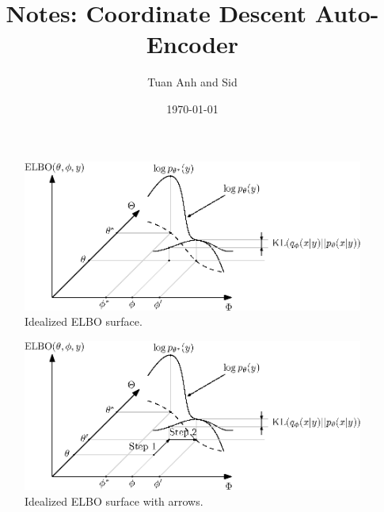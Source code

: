 \documentclass[a4paper]{article}
\title{Notes: Coordinate Descent Auto-Encoder}
\author{Tuan Anh and Sid}
\date{\today}
\begin{document}
\maketitle

\listoftodos





\begin{figure}
    \centering
    \includegraphics{figures/elbo}
    \caption{Idealized \gls{ELBO} surface.}
\end{figure}

\begin{figure}
    \centering
    \includegraphics{figures/elbo2}
    \caption{Idealized \gls{ELBO} surface with arrows.}
\end{figure}


\end{document}
